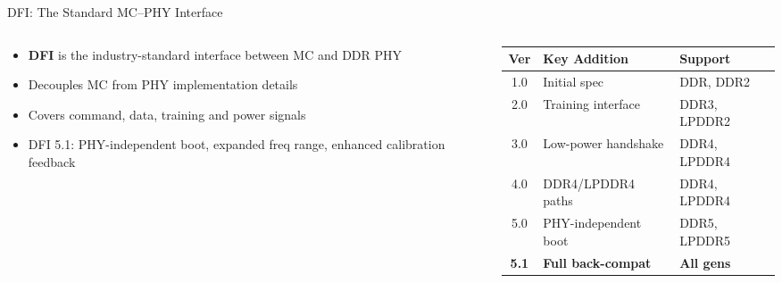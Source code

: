 \documentclass[aspectratio=169,10pt]{beamer}
\begin{document}
\begin{frame}{DFI: The Standard MC--PHY Interface}
\begin{columns}[T]

\begin{column}{0.38\textwidth}
  \vspace{6pt}
  \begin{itemize}\setlength\itemsep{8pt}
    \item \textbf{DFI} is the industry-standard interface between MC and DDR PHY
    \item Decouples MC from PHY implementation details
    \item Covers command, data, training and power signals
    \item DFI 5.1: PHY-independent boot, expanded freq range, enhanced calibration feedback
  \end{itemize}
\end{column}

\begin{column}{0.58\textwidth}
  \centering
  \vspace{4pt}

  \vspace{10pt}

  {\scriptsize
  \begin{tabular}{@{}clp{22mm}@{}}
    \toprule
    \textbf{Ver} & \textbf{Key Addition} & \textbf{Support}\\
    \midrule
    1.0 & Initial spec          & DDR, DDR2\\
    2.0 & Training interface    & DDR3, LPDDR2\\
    3.0 & Low-power handshake   & DDR4, LPDDR4\\
    4.0 & DDR4/LPDDR4 paths & DDR4, LPDDR4\\
    5.0 & PHY-independent boot  & DDR5, LPDDR5\\
    \rowcolor{ddrgold!30}
    \textbf{5.1} & \textbf{Full back-compat} & \textbf{All gens}\\
    \bottomrule
  \end{tabular}}
\end{column}

\end{columns}
\end{frame}
\end{document}
